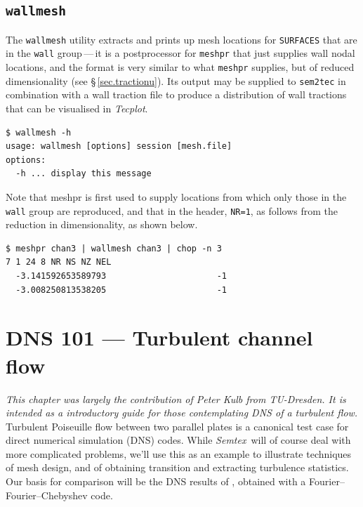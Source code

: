 \documentclass[11pt]{report}
\newcommand{\Semtex}{\emph{Semtex}} \newcommand{\Dog}{\emph{Dog}}
\newcommand{\Tecplot}{\emph{Tecplot}}
\begin{document}
\section{\texttt{wallmesh}}
\label{sec.wallmesh}

The \verb|wallmesh| utility extracts and prints up mesh locations for
\verb|SURFACES| that are in the \verb|wall| group\,---\,it is a
postprocessor for \verb|meshpr| that just supplies wall nodal
locations, and the format is very similar to what \verb|meshpr|
supplies, but of reduced dimensionality (see \S\,\ref{sec.tractionu}).
Its output may be supplied to \verb|sem2tec| in combination with a
wall traction file to produce a distribution of wall tractions that
can be visualised in \Tecplot.
%
{\small
\begin{verbatim}
$ wallmesh -h
usage: wallmesh [options] session [mesh.file]
options:
  -h ... display this message
\end{verbatim}
}
%
Note that meshpr is first used to supply locations from which only
those in the \verb|wall| group are reproduced, and that in the header,
\verb|NR=1|, as follows from the reduction in dimensionality, as shown
below.  {\small
\begin{verbatim}
$ meshpr chan3 | wallmesh chan3 | chop -n 3
7 1 24 8 NR NS NZ NEL
  -3.141592653589793                      -1
  -3.008250813538205                      -1
\end{verbatim}
}
%


\chapter{DNS 101 --- Turbulent channel flow}
\label{ch.dns101}

\textsl{This chapter was largely the contribution of Peter Kulb from
  TU-Dresden.  It is intended as a introductory guide for those
  contemplating DNS of a turbulent flow.}\\

Turbulent Poiseuille flow between two parallel plates is a canonical
test case for direct numerical simulation (DNS) codes.  While
\Semtex\ will of course deal with more complicated problems, we'll use
this as an example to illustrate techniques of mesh design, and of
obtaining transition and extracting turbulence statistics.  Our basis
for comparison will be the DNS results of \citet*{kmm87}, obtained
with a Fourier--Fourier--Chebyshev code.
\end{document}
